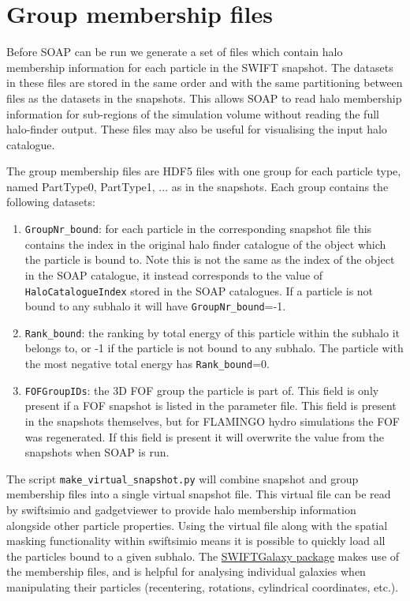 \documentclass{article}
\begin{document}
\section{Group membership files}

Before SOAP can be run we generate a set of files which contain halo
membership information for each particle in the SWIFT snapshot. The
datasets in these files are stored in the same order and with the same
partitioning between files as the datasets in the snapshots. This
allows SOAP to read halo membership information for sub-regions of the
simulation volume without reading the full halo-finder output. These files may
also be useful for visualising the input halo catalogue.

The group membership files are HDF5 files with one group for each
particle type, named PartType0, PartType1, ... as in the
snapshots. Each group contains the following datasets:

\begin{enumerate}
\item \verb|GroupNr_bound|: for each particle in the corresponding snapshot
  file this contains the index in the original halo finder catalogue of the object 
  which the particle is bound to. Note this is not the same as the index of the object
  in the SOAP catalogue, it instead corresponds to the value of \verb|HaloCatalogueIndex|
  stored in the SOAP catalogues. If a particle is not bound to any subhalo it
  will have \verb|GroupNr_bound|=-1.
\item \verb|Rank_bound|: the ranking by total energy of this particle within
  the subhalo it belongs to, or -1 if the particle is not bound to
  any subhalo. The particle with the most negative total energy has
  \verb|Rank_bound|=0.
\item \verb|FOFGroupIDs|: the 3D FOF group the particle is part of.
  This field is only present if a FOF snapshot is listed in the
  parameter file. This field is present in the snapshots themselves,
  but for FLAMINGO hydro simulations the FOF was regenerated. If this
  field is present it will overwrite the value from the snapshots when
  SOAP is run.
\end{enumerate}

The script \verb|make_virtual_snapshot.py| will combine snapshot and group membership files
into a single virtual snapshot file. This virtual file can be read by swiftsimio and 
gadgetviewer to provide halo membership information alongside other particle properties.
Using the virtual file along with the spatial masking functionality within swiftsimio
means it is possible to quickly load all the particles bound to a given subhalo.
The \href{https://swiftgalaxy.readthedocs.io/en/latest/index.html}{SWIFTGalaxy package}
makes use of the membership files, and is helpful for analysing individual galaxies when 
manipulating their particles (recentering, rotations, cylindrical coordinates, etc.).
\end{document}
